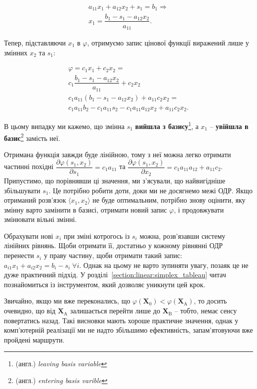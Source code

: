 \documentclass[\main/book.tex]{subfiles}
\begin{document}
 \[
 \begin{split}
  a_{11} x_1 + a_{12} x_2 + s_1 = b_1 \Rightarrow \\
  x_1 = \dfrac{b_1 - s_1 - a_{12} x_2}{a_{11}}.
 \end{split}
 \]
 
Тепер, підставляючи $x_1$ в $\varphi$, отримуємо запис цінової функції виражений лише у змінних $x_2$ та $s_1$:
 
\[
  \begin{split}
   \varphi = c_1 x_1 + c_2 x_2 = \\
   c_1 \dfrac{b_1 - s_1 - a_{12} x_2}{a_{11}} + c_2 x_2 \\
   c_1 a_{11} (b_1 - s_1 - a_{12} x_2) + a_{11} c_2 x_2 = \\
   c_1 a_{11} b_2 - c_1 a_{11} s_2 - c_1 a_{11} a_{12} x_2 + a_{11} c_2 x_2.
  \end{split}
\]

В цьому випадку ми кажемо, що змінна $s_1$ \textbf{вийшла з базису}\footnote{(англ.) \textit{leaving basis variable}}, а $x_1$ -- \textbf{увійшла в базис}\footnote{(англ.) \textit{entering basis varible}} замість неї.

Отримана функція завжди буде лінійною, тому з неї можна легко отримати частинні похідні $\dfrac{\partial \varphi(s_1, x_2)}{\partial s_1} = c_1 a_{11}$ та $\dfrac{\partial \varphi(s_1, x_2)}{\partial x_2} = c_1 a_{11} a_{12} + a_{11} c_2$. Припустимо, що порівнявши ці значення, ми з'ясували, що найвигідніше збільшувати $s_1$. Це потрібно робити доти, доки ми не досягнемо межі ОДР. Якщо отриманий розв'язок ${\langle x_1, x_2 \rangle}$ не буде оптимальним, потрібно знову оцінити, яку змінну варто замінити в базисі, отримати новий запис $\varphi$, і продовжувати змінювати вільні змінні.

\begin{note}
 Обрахувати нові $x_i$ при зміні котрогось із $s_i$ можна, розв'язавши систему лінійних рівнянь. Щоби отримати її, достатньо у кожному рівнянні ОДР перенести $s_i$ у праву частину, щоби отримати такий запис: $a_{i1} x_1 + a_{i2} x_2 = b_i - s_i \; \forall i$. Однак на цьому не варто зупиняти увагу, позаяк це не дуже практичний підхід. У розділі~\ref{section:linear:simplex_tableau} читач познайомиться із інструментом, який дозволяє уникнути цей крок.
\end{note}

\begin{note}
 Звичайно, якщо ми вже переконались, що ${\varphi(\mathbf{X}_0) < \varphi(\mathbf{X}_\mathrm{A})}$, то досить очевидно, що від $\mathbf{X}_\mathrm{A}$ залишається перейти лише до $\mathbf{X}_\mathrm{B}$ -- тобто, немає сенсу повертатись назад. Такі висновки мають хороше практичне значення, однак у комп'ютерній реалізації ми не надто збільшимо ефективність, запам'ятовуючи вже пройдені маршрути.
\end{note}
\end{document}
